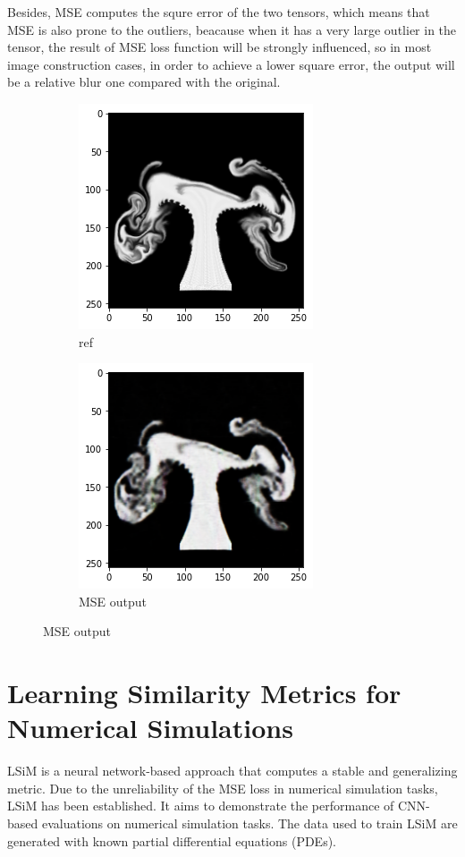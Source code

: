 \documentclass[a4paper,12pt,twoside]{report}
\begin{document}
Besides, MSE computes the squre error of the two tensors, which means that MSE is also prone to the outliers, beacause when it has a very large outlier in the tensor, the result of MSE loss function will be strongly influenced, so in most image construction cases, in order to achieve a lower square error, the output will be a relative blur one compared with the original.
\begin{figure}
\centering
\begin{subfigure}{0.4\textwidth}
  \centering
  \includegraphics[scale=0.5]{MSEref.png}
  \caption{ref}
\end{subfigure}
\begin{subfigure}{0.4\textwidth}
  \centering
  \includegraphics[scale=0.5]{MSEblur.png}
  \caption{MSE output}
\end{subfigure}
\end{figure}

\section{Learning Similarity Metrics for Numerical Simulations}

LSiM \cite{kohl2020learning} is a neural network-based approach that computes a stable and generalizing metric. Due to the unreliability of the MSE loss in numerical simulation tasks, LSiM has been established. It aims to demonstrate the performance of CNN-based evaluations on numerical simulation tasks. The data used to train LSiM are generated with known partial differential equations (PDEs). 
\end{document}
